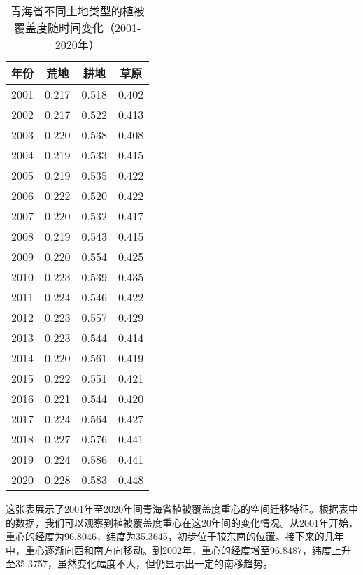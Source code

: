 \documentclass[AutoFakeBold]{LZUThesis-PgD&PhD}
\begin{document}
    \begin{table}[H]
        \centering
        \begin{tabular}{|c|c|c|c|}
            \hline
            \textbf{年份} & \textbf{荒地} & \textbf{耕地} & \textbf{草原} \\
            \hline
            2001 & 0.217 & 0.518 & 0.402 \\
            2002 & 0.217 & 0.522 & 0.413 \\
            2003 & 0.220 & 0.538 & 0.408 \\
            2004 & 0.219 & 0.533 & 0.415 \\
            2005 & 0.219 & 0.535 & 0.422 \\
            2006 & 0.222 & 0.520 & 0.422 \\
            2007 & 0.220 & 0.532 & 0.417 \\
            2008 & 0.219 & 0.543 & 0.415 \\
            2009 & 0.220 & 0.554 & 0.425 \\
            2010 & 0.223 & 0.539 & 0.435 \\
            2011 & 0.224 & 0.546 & 0.422 \\
            2012 & 0.223 & 0.557 & 0.429 \\
            2013 & 0.223 & 0.544 & 0.414 \\
            2014 & 0.220 & 0.561 & 0.419 \\
            2015 & 0.222 & 0.551 & 0.421 \\
            2016 & 0.221 & 0.544 & 0.420 \\
            2017 & 0.224 & 0.564 & 0.427 \\
            2018 & 0.227 & 0.576 & 0.441 \\
            2019 & 0.224 & 0.586 & 0.441 \\
            2020 & 0.228 & 0.583 & 0.448 \\
            \hline
        \end{tabular}
        \caption{青海省不同土地类型的植被覆盖度随时间变化（2001-2020年）}
    \end{table}
    
    
    \par
    这张表展示了2001年至2020年间青海省植被覆盖度重心的空间迁移特征。根据表中的数据，我们可以观察到植被覆盖度重心在这20年间的变化情况。从2001年开始，重心的经度为96.8046，纬度为35.3645，初步位于较东南的位置。接下来的几年中，重心逐渐向西和南方向移动。到2002年，重心的经度增至96.8487，纬度上升至35.3757，虽然变化幅度不大，但仍显示出一定的南移趋势。
		
\end{document}

